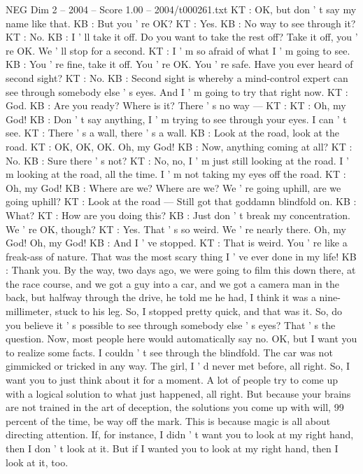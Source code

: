\begin{textsample}{NEG Dim 2 – 2004 – Score 1.00 – 2004/t000261.txt}
KT : OK, but don ' t say my name like that.
KB : But you ' re OK?
KT : Yes.
KB : No way to see through it?
KT : No.
KB : I ' ll take it off.
Do you want to take the rest off?
Take it off, you ' re OK.
We ' ll stop for a second.
KT : I ' m so afraid of what I ' m going to see.
KB : You ' re fine, take it off.
You ' re OK.
You ' re safe.
Have you ever heard of second sight?
KT : No.
KB : Second sight is whereby a mind-control expert can see through somebody else ' s eyes.
And I ' m going to try that right now.
KT : God.
KB : Are you ready?
Where is it?
There ' s no way — KT : KT : Oh, my God!
KB : Don ' t say anything, I ' m trying to see through your eyes.
I can ' t see.
KT : There ' s a wall, there ' s a wall.
KB : Look at the road, look at the road.
KT : OK, OK, OK.
Oh, my God!
KB : Now, anything coming at all?
KT : No.
KB : Sure there ' s not?
KT : No, no, I ' m just still looking at the road.
I ' m looking at the road, all the time.
I ' m not taking my eyes off the road.
KT : Oh, my God!
KB : Where are we?
Where are we?
We ' re going uphill, are we going uphill?
KT : Look at the road — Still got that goddamn blindfold on.
KB : What?
KT : How are you doing this?
KB : Just don ' t break my concentration.
We ' re OK, though?
KT : Yes.
That ' s so weird.
We ' re nearly there.
Oh, my God!
Oh, my God!
KB : And I ' ve stopped.
KT : That is weird.
You ' re like a freak-ass of nature.
That was the most scary thing I ' ve ever done in my life!
KB : Thank you.
By the way, two days ago, we were going to film this down there, at the race course, and we got a guy into a car, and we got a camera man in the back, but halfway through the drive, he told me he had, I think it was a nine- millimeter, stuck to his leg.
So, I stopped pretty quick, and that was it.
So, do you believe it ' s possible to see through somebody else ' s eyes?
That ' s the question.
Now, most people here would automatically say no.
OK, but I want you to realize some facts.
I couldn ' t see through the blindfold.
The car was not gimmicked or tricked in any way.
The girl, I ' d never met before, all right.
So, I want you to just think about it for a moment.
A lot of people try to come up with a logical solution to what just happened, all right.
But because your brains are not trained in the art of deception, the solutions you come up with will, 99 percent of the time, be way off the mark.
This is because magic is all about directing attention.
If, for instance, I didn ' t want you to look at my right hand, then I don ' t look at it.
But if I wanted you to look at my right hand, then I look at it, too.

\end{textsample}
